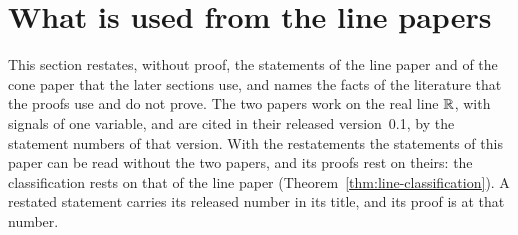 %

\section{What is used from the line papers}\label{sec:line}

This section restates, without proof, the statements of the line paper
 and of the cone paper  that the later
sections use, and names the facts of the literature that the proofs use and do not prove. The
two papers work on the real line $\mathbb{R}$, with signals of one variable, and are cited in their
released version~0.1, by the statement numbers of that version. With the restatements the
statements of this paper can be
read without the two papers, and its proofs rest on theirs: the classification rests on that of
the line paper (Theorem~\ref{thm:line-classification}). A restated statement carries its released
number in its title, and its proof is at that number.

